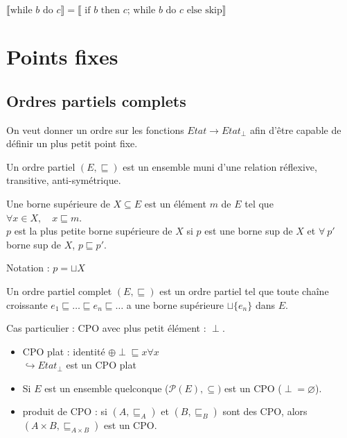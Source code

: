 \documentclass[10pt,a4paper]{article}
\newcommand{\semm}[1]{\llbracket #1 \rrbracket }
\begin{document}
\begin{prop}
$ \semm{\text{while }b\text{ do }c} = \semm{\text{ if $b$ then $c$; while $b$ do $c$ else skip}}$
\end{prop}


\section{Points fixes}

\subsection{Ordres partiels complets}
On veut donner un ordre sur les fonctions $Etat \rightarrow Etat_{\perp}$ afin d'être capable de définir un plus petit point fixe.
\begin{definition}
 Un ordre partiel $(E,\sqsubseteq)$ est un ensemble muni d'une relation réflexive, transitive, anti-symétrique.
\end{definition}
\begin{definition}
 Une borne supérieure de $X \subseteq E$ est un élément $m$ de $E$ tel que \\
\indent $\forall x \in X, \quad x \sqsubseteq m$.\\
$p$ est la plus petite borne supérieure de $X$ si $p$ est une borne sup de $X$ et $\forall \: p'$ borne sup de $X$, $p \sqsubseteq p'$.

Notation : $p = \sqcup X$
\end{definition}
\begin{definition}
 Un ordre partiel complet $(E,\sqsubseteq)$ est un ordre partiel tel que toute chaîne croissante $e_1 \sqsubseteq \dots \sqsubseteq e_n \sqsubseteq \dots $ a une borne supérieure $\sqcup \{ e_n \}$ dans $E$.

 Cas particulier : CPO avec plus petit élément : $\perp$.
\end{definition}
\begin{exs}[de CPO :]
 \begin{itemize}
  \item CPO plat : identité $\oplus \perp \sqsubseteq x \forall x$ 
  \\ $\hookrightarrow Etat_{\perp}$ est un CPO plat
  \item Si $E$ est un ensemble quelconque ($\mathcal{P}(E), \subseteq)$ est un CPO ($\perp = \varnothing $).
  \item produit de CPO : si $(A, \sqsubseteq_A)$ et $(B, \sqsubseteq_B)$ sont des CPO, alors $(A\times B, \sqsubseteq_{A\times B})$ est un CPO.
 \end{itemize}

\end{exs}
\end{document}
